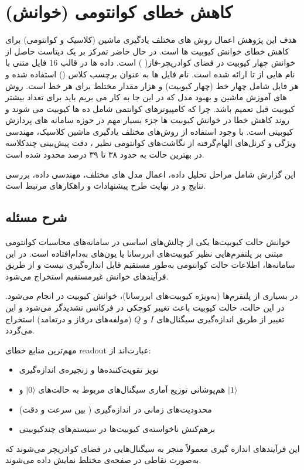 
\chapter*{کاهش خطای کوانتومی (خوانش)}
\label{intro}

هدف این پژوهش اعمال روش های مختلف یادگیری ماشین (کلاسیک و کوانتومی) برای کاهش خطای خوانش کیوبیت ها است. در حال حاضر تمرکز بر یک دیتاست حاصل از خوانش چهار کیوبیت در فضای کوادریچر-فاز( ) است. 
داده ها در قالب 16 فایل متنی با نام هایی از 
تا 
ارائه شده است. نام فایل ها به عنوان برچسب کلاس 
()
استفاده شده و هر فایل شامل چهار خط (چهار کیوبیت) و هزار مقدار مختلط برای هر خط است. 
روش های آموزش ماشین و بهبود مدل که در این جا به کار می بریم باید برای تعداد بیشتر کیوبیت قبل تعمیم باشد. چرا که کامپیوترهای کوانتمی شامل ده ها کیوبیت می شوند و روند کاهش خطا در خوانش کیوبیت ها جزء بسیار مهم در حوزه سامانه های پردازش کیوبیتی است. 
با وجود استفاده از روش‌های مختلف یادگیری ماشین کلاسیک، مهندسی ویژگی و کرنل‌های الهام‌گرفته از نگاشت‌های کوانتومی نظیر ، دقت پیش‌بینی چندکلاسه در بهترین حالت به حدود ۳۸ تا ۳۹ درصد محدود شده است. 

این گزارش شامل مراحل تحلیل داده، اعمال مدل های مختلف، مهندسی داده، بررسی نتایج و در نهایت طرح پیشنهادات و راهکارهای مرتبط است. 

\section*{شرح مسئله}
\label{sec:explain}

خوانش حالت کیوبیت‌ها یکی از چالش‌های اساسی در سامانه‌های محاسبات کوانتومی مبتنی بر پلتفرم‌هایی نظیر کیوبیت‌های ابررسانا یا یون‌های به‌دام‌افتاده است. در این سامانه‌ها، اطلاعات حالت کوانتومی به‌طور مستقیم قابل اندازه‌گیری نیست و از طریق فرآیندهای خوانش غیرمستقیم استخراج می‌شود. 


در بسیاری از پلتفرم‌ها (به‌ویژه کیوبیت‌های ابررسانا)، خوانش کیوبیت در  انجام می‌شود. در این حالت، حالت کیوبیت باعث تغییر کوچکی در فرکانس تشدیدگر می‌شود و این تغییر از طریق اندازه‌گیری سیگنال‌های \(I\) و \(Q\) (مولفه‌های درفاز و درتعامد) استخراج می‌گردد.

مهم‌ترین منابع خطای readout عبارت‌اند از:
\begin{itemize}
	\item نویز تقویت‌کننده‌ها و زنجیره‌ی اندازه‌گیری
	\item هم‌پوشانی توزیع آماری سیگنال‌های مربوط به حالت‌های \(|0\rangle\) و \(|1\rangle\)
	\item محدودیت‌های زمانی در اندازه‌گیری ( بین سرعت و دقت)
	\item برهم‌کنش ناخواسته‌ی کیوبیت‌ها در سیستم‌های چندکیوبیتی
\end{itemize}
این فرآیندهای اندازه گیری معمولاً منجر به سیگنال‌هایی در فضای کوادریچر می‌شوند که به‌صورت نقاطی در صفحه‌ی مختلط  نمایش داده می‌شوند.

